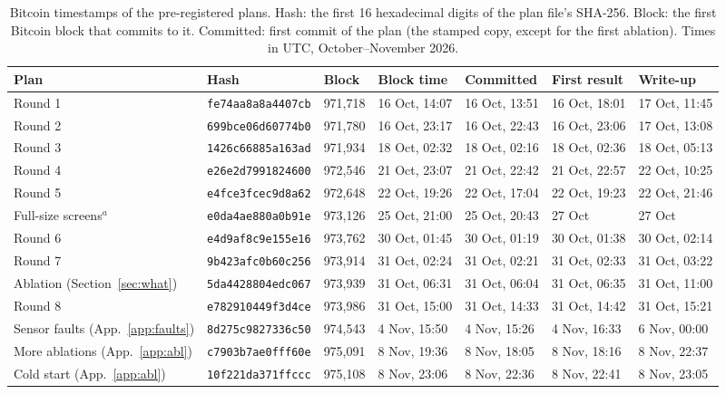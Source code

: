 \documentclass{article}
\begin{document}
\begin{table}[!htb]\centering
\caption{Bitcoin timestamps of the pre-registered plans. Hash: the first 16 hexadecimal digits of the plan file's
SHA-256. Block: the first Bitcoin block that commits to it. Committed: first commit of the plan (the stamped copy, except for the first ablation). Times in UTC, October--November 2026.}\label{tab:stamps}
\footnotesize
\setlength{\tabcolsep}{3pt}
\begin{tabular}{lllllll}\toprule
Plan & Hash & Block & Block time & Committed & First result & Write-up\\\midrule
Round 1 & \texttt{fe74aa8a8a4407cb} & 971,718 & 16 Oct, 14:07 & 16 Oct, 13:51 & 16 Oct, 18:01 & 17 Oct, 11:45\\
Round 2 & \texttt{699bce06d60774b0} & 971,780 & 16 Oct, 23:17 & 16 Oct, 22:43 & 16 Oct, 23:06 & 17 Oct, 13:08\\
Round 3 & \texttt{1426c66885a163ad} & 971,934 & 18 Oct, 02:32 & 18 Oct, 02:16 & 18 Oct, 02:36 & 18 Oct, 05:13\\
Round 4 & \texttt{e26e2d7991824600} & 972,546 & 21 Oct, 23:07 & 21 Oct, 22:42 & 21 Oct, 22:57 & 22 Oct, 10:25\\
Round 5 & \texttt{e4fce3fcec9d8a62} & 972,648 & 22 Oct, 19:26 & 22 Oct, 17:04 & 22 Oct, 19:23 & 22 Oct, 21:46\\
Full-size screens$^{a}$ & \texttt{e0da4ae880a0b91e} & 973,126 & 25 Oct, 21:00 & 25 Oct, 20:43 & 27 Oct & 27 Oct\\
Round 6 & \texttt{e4d9af8c9e155e16} & 973,762 & 30 Oct, 01:45 & 30 Oct, 01:19 & 30 Oct, 01:38 & 30 Oct, 02:14\\
Round 7 & \texttt{9b423afc0b60c256} & 973,914 & 31 Oct, 02:24 & 31 Oct, 02:21 & 31 Oct, 02:33 & 31 Oct, 03:22\\
Ablation (Section~\ref{sec:what}) & \texttt{5da4428804edc067} & 973,939 & 31 Oct, 06:31 & 31 Oct, 06:04 & 31 Oct, 06:35 & 31 Oct, 11:00\\
Round 8 & \texttt{e782910449f3d4ce} & 973,986 & 31 Oct, 15:00 & 31 Oct, 14:33 & 31 Oct, 14:42 & 31 Oct, 15:21\\
Sensor faults (App.~\ref{app:faults}) & \texttt{8d275c9827336c50} & 974,543 & 4 Nov, 15:50 & 4 Nov, 15:26 & 4 Nov, 16:33 & 6 Nov, 00:00\\
More ablations (App.~\ref{app:abl}) & \texttt{c7903b7ae0fff60e} & 975,091 & 8 Nov, 19:36 & 8 Nov, 18:05 & 8 Nov, 18:16 & 8 Nov, 22:37\\
Cold start (App.~\ref{app:abl}) & \texttt{10f221da371ffccc} & 975,108 & 8 Nov, 23:06 & 8 Nov, 22:36 & 8 Nov, 22:41 & 8 Nov, 23:05\\

\end{tabular}
\end{table}
\end{document}
